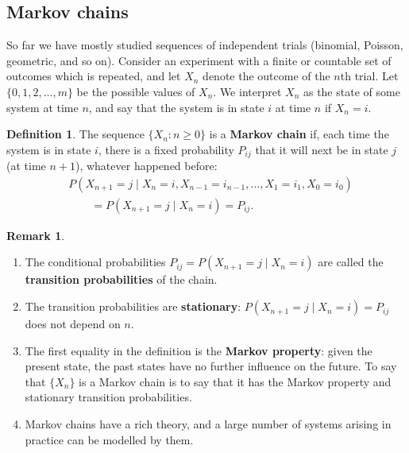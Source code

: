 \documentclass[11pt,a4paper]{article}
\theoremstyle{definition}
\newtheorem{defn}[thm]{Definition}
\newtheorem*{remark}{Remark}
\begin{document}
\subsection{Markov chains}
So far we have mostly studied sequences of independent trials (binomial, Poisson, geometric, and so on). Consider an experiment with a finite or
countable set of outcomes which is repeated, and let $X_n$ denote the outcome of the $n$th trial. Let $\{0, 1, 2, \dots, m\}$ be the possible values of $X_n$. We
interpret $X_n$ as the state of some system at time $n$, and say that the system is in state $i$ at time $n$ if $X_n = i$.

\begin{defn}
The sequence $\{X_n : n \ge 0\}$ is a \textbf{Markov chain} if, each time the system is in state $i$, there is a fixed probability $P_{ij}$ that it will next
be in state $j$ (at time $n + 1$), whatever happened before:
\begin{align*}
&P(X_{n+1} = j \mid X_n = i, X_{n-1} = i_{n-1}, \dots, X_1 = i_1, X_0 = i_0) \\
&\qquad = P(X_{n+1} = j \mid X_n = i) = P_{ij} .
\end{align*}
\end{defn}

\begin{remark}
\begin{enumerate}[label=(\roman*)]
\item The conditional probabilities $P_{ij} = P(X_{n+1} = j \mid X_n = i)$ are called the \textbf{transition probabilities} of the chain.
\item The transition probabilities are \textbf{stationary}: $P(X_{n+1} = j \mid X_n = i) = P_{ij}$ does not depend on $n$.
\item The first equality in the definition is the \textbf{Markov property}: given the present state, the past states have no further influence on the
future. To say that $\{X_n\}$ is a Markov chain is to say that it has the Markov property and stationary transition probabilities.
\item Markov chains have a rich theory, and a large number of systems arising in practice can be modelled by them.
\end{enumerate}
\end{remark}
\end{document}
